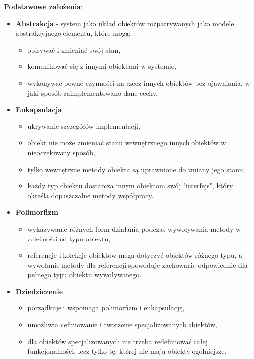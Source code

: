 \documentclass[../main.tex]{subfiles}
\begin{document}
    \textbf{Podstawowe założenia}:
    \begin{itemize}
        \item \textbf{Abstrakcja} - system jako układ obiektów rozpatrywanych jako modele
        abstrakcyjnego elementu, które mogą:
        \begin{itemize}
            \item opisywać i zmieniać swój stan,
            \item komunikować się z innymi obiektami w systemie,
            \item wykonywać pewne czynności na rzecz innych obiektów bez ujawniania, w jaki sposób zaimplementowano
            dane cechy.
        \end{itemize}
        \item \textbf{Enkapsulacja}
        \begin{itemize}
            \item ukrywanie szczegółów implementacji,
            \item obiekt nie może zmieniać stanu wewnętrznego innych obiektów w nieoczekiwany sposób,
            \item tylko wewnętrzne metody obiektu są uprawnione do zmiany jego stanu,
            \item każdy typ obiektu dostarcza innym obiektom swój "interfejs", który określa dopuszczalne metody współpracy.
        \end{itemize}
        \item \textbf{Polimorfizm}
        \begin{itemize}
            \item wykazywanie różnych form działania podczas wywoływania metody w zależności od typu obiektu,
            \item referencje i kolekcje obiektów mogą dotyczyć obiektów różnego typu, a wywołanie metody dla
            referencji spowoduje zachowanie odpowiednie dla pełnego typu obiektu wywoływanego.
        \end{itemize}
        \item \textbf{Dziedziczenie}
        \begin{itemize}
            \item porządkuje i wspomaga polimorfizm i enkapsulację,
            \item umożliwia definiowanie i tworzenie specjalizowanych obiektów,
            \item dla obiektów specjalizowanych nie trzeba redefiniować całej funkcjonalności, lecz tylko tę,
            której nie mają obiekty ogólniejsze.
        \end{itemize}
    \end{itemize}
\end{document}
